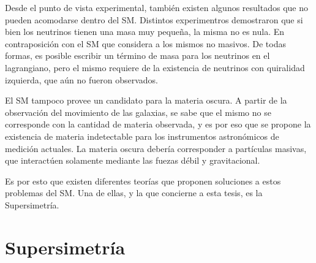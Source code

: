 Desde el punto de vista experimental, también existen algunos resultados que no pueden acomodarse dentro del SM. Distintos experimentros demostraron que si bien los neutrinos tienen una masa muy pequeña, la misma no es nula. En contraposición con el SM que considera a los mismos no masivos. De todas formas, es posible escribir un término de masa para los neutrinos en el lagrangiano, pero el mismo requiere de la existencia de neutrinos con quiralidad izquierda, que aún no fueron observados.

El SM tampoco provee un candidato para la materia oscura. A partir de la observación del movimiento de las galaxias, se sabe que el mismo no se corresponde con la cantidad de materia observada, y es por eso que se propone la existencia de materia indetectable para los instrumentos astronómicos de medición actuales. La materia oscura debería corresponder a partículas masivas, que interactúen solamente mediante las fuezas débil y gravitacional.

Es por esto que existen diferentes teorías que proponen soluciones a estos problemas del SM. Una de ellas, y la que concierne a esta tesis, es la Supersimetría.

\section{Supersimetría}



